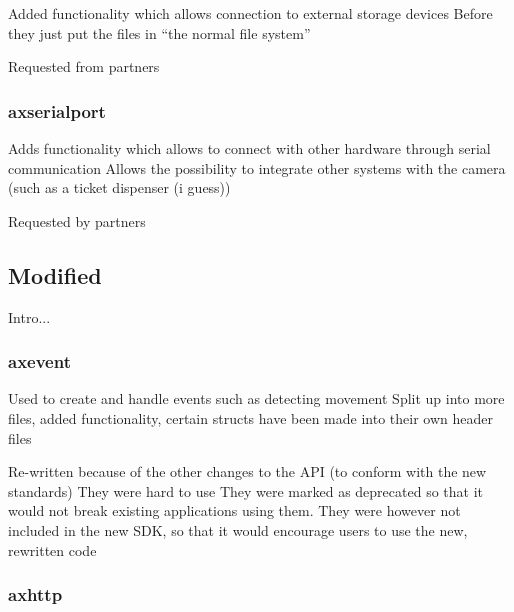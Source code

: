 \documentclass[conference]{IEEEtran}
\begin{document}
Added functionality which allows connection to external storage devices
Before they just put the files in “the normal file system”



Requested from partners







\subsubsection{axserialport}

Adds functionality which allows to connect with other hardware through serial communication
Allows the possibility to integrate other systems with the camera (such as a ticket dispenser (i guess))

Requested by partners 







\subsection{Modified}
Intro...

\subsubsection{axevent}


Used to create and handle events such as detecting movement 
Split up into more files, added functionality, certain structs have been made into their own header files



Re-written because of the other changes to the API (to conform with the new standards)
They were hard to use
They were marked as deprecated so that it would not break existing applications using them. 
They were however not included in the new SDK, so that it would encourage users to use the new, rewritten code







\subsubsection{axhttp}
\end{document}
